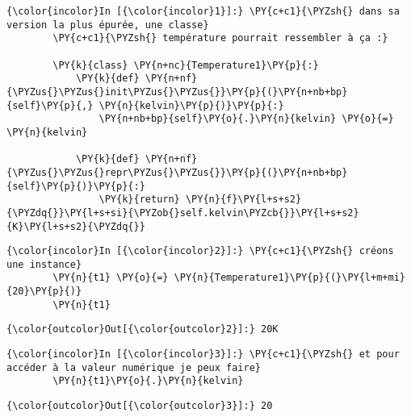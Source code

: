     \begin{Verbatim}[commandchars=\\\{\},frame=single,framerule=0.3mm,rulecolor=\color{cellframecolor}]
{\color{incolor}In [{\color{incolor}1}]:} \PY{c+c1}{\PYZsh{} dans sa version la plus épurée, une classe}
        \PY{c+c1}{\PYZsh{} température pourrait ressembler à ça :}
        
        \PY{k}{class} \PY{n+nc}{Temperature1}\PY{p}{:}
            \PY{k}{def} \PY{n+nf}{\PYZus{}\PYZus{}init\PYZus{}\PYZus{}}\PY{p}{(}\PY{n+nb+bp}{self}\PY{p}{,} \PY{n}{kelvin}\PY{p}{)}\PY{p}{:}
                \PY{n+nb+bp}{self}\PY{o}{.}\PY{n}{kelvin} \PY{o}{=} \PY{n}{kelvin}
                
            \PY{k}{def} \PY{n+nf}{\PYZus{}\PYZus{}repr\PYZus{}\PYZus{}}\PY{p}{(}\PY{n+nb+bp}{self}\PY{p}{)}\PY{p}{:}
                \PY{k}{return} \PY{n}{f}\PY{l+s+s2}{\PYZdq{}}\PY{l+s+si}{\PYZob{}self.kelvin\PYZcb{}}\PY{l+s+s2}{K}\PY{l+s+s2}{\PYZdq{}}
\end{Verbatim}


    \begin{Verbatim}[commandchars=\\\{\},frame=single,framerule=0.3mm,rulecolor=\color{cellframecolor}]
{\color{incolor}In [{\color{incolor}2}]:} \PY{c+c1}{\PYZsh{} créons une instance}
        \PY{n}{t1} \PY{o}{=} \PY{n}{Temperature1}\PY{p}{(}\PY{l+m+mi}{20}\PY{p}{)}
        \PY{n}{t1}
\end{Verbatim}


\begin{Verbatim}[commandchars=\\\{\},frame=single,framerule=0.3mm,rulecolor=\color{cellframecolor}]
{\color{outcolor}Out[{\color{outcolor}2}]:} 20K
\end{Verbatim}
            
    \begin{Verbatim}[commandchars=\\\{\},frame=single,framerule=0.3mm,rulecolor=\color{cellframecolor}]
{\color{incolor}In [{\color{incolor}3}]:} \PY{c+c1}{\PYZsh{} et pour accéder à la valeur numérique je peux faire}
        \PY{n}{t1}\PY{o}{.}\PY{n}{kelvin}
\end{Verbatim}


\begin{Verbatim}[commandchars=\\\{\},frame=single,framerule=0.3mm,rulecolor=\color{cellframecolor}]
{\color{outcolor}Out[{\color{outcolor}3}]:} 20
\end{Verbatim}
            
